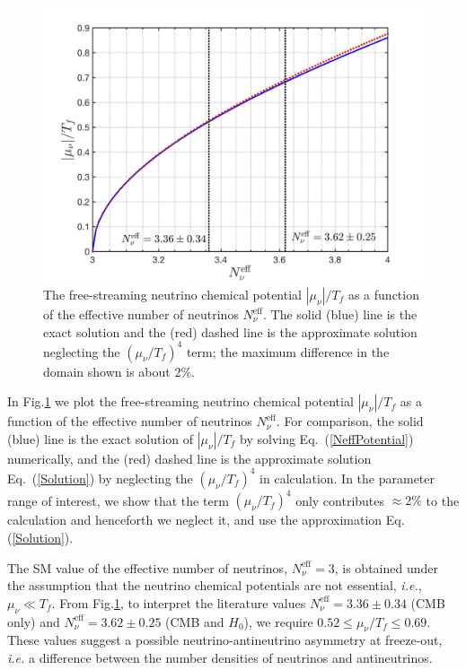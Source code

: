 \begin{figure}[t]
\begin{center}
\includegraphics[width=0.8\linewidth]{./plots/Chemical_Potential_Neff}
\caption{The free-streaming neutrino chemical potential $|\mu_\nu|/T_f$ as a function of the effective number of neutrinos $N_\nu^{\mathrm{eff}}$. The solid (blue) line is the exact solution and the (red) dashed line is the approximate solution neglecting the $(\mu_\nu/T_f)^4$ term; the maximum difference in the domain shown is about $2\%$. }
\label{ChemicalPotentialNeff}
\end{center}
\end{figure}
In Fig.\;\ref{ChemicalPotentialNeff} we plot the free-streaming neutrino chemical potential $|\mu_\nu|/T_f$ as a function of the effective number of neutrinos $N_\nu^{\mathrm{eff}}$. For comparison, the solid (blue) line is the exact solution of $|\mu_\nu|/T_f$ by solving Eq.~(\ref{NeffPotential}) numerically, and the (red) dashed line is the approximate solution Eq.~(\ref{Solution}) by neglecting the $(\mu_\nu/T_f)^4$ in calculation. In the parameter range of interest, we show that the term $(\mu_\nu/T_f)^4$ only contributes $\approx 2\%$ to the calculation and henceforth we neglect it, and use the approximation Eq.\;(\ref{Solution}). 

The SM value of the effective number of neutrinos, $N_\nu^{\mathrm{eff}}=3$, is obtained under the assumption that the neutrino chemical potentials are not essential, {\it i.e.\/}, $\mu_\nu\ll T_f$. From Fig.\;\ref{ChemicalPotentialNeff}, to interpret the literature values $N_\nu^{\mathrm{eff}}=3.36\pm0.34$ (CMB only) and $N_\nu^{\mathrm{eff}}= 3.62\pm0.25$ (CMB and $H_0$), we require $0.52\leqslant\mu_\nu/T_f\leqslant0.69$. These values suggest a possible neutrino-antineutrino asymmetry at freeze-out, {\it i.e.\/} a difference between the number densities of neutrinos and antineutrinos.




